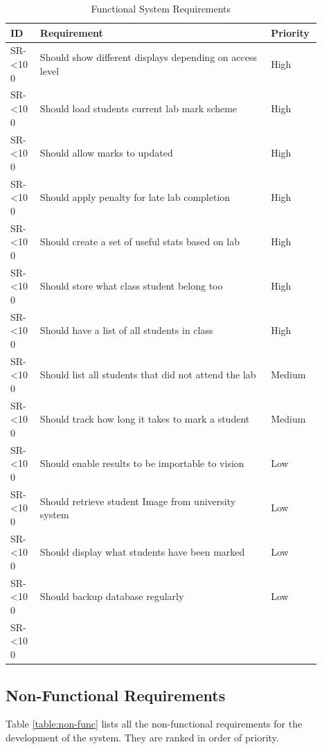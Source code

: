 \documentclass[12pt]{article}  %
\newcommand{\rid}[1]{\centering #1-\ifnum\value{requirement}<10 0\fi\arabic{requirement} \stepcounter{requirement}}
\begin{document}
\begin{spacing}{1.2}
\begin{longtable}{|p{0.09\linewidth}|p{0.7\linewidth}|p{0.1\linewidth}|}
\caption{Functional System Requirements} \label{table:funct-sys} \\
\hline


\textbf{ID} & \textbf{Requirement} & \textbf{Priority}\\
\hline \hline

\rid{SR} & Should show different displays depending on access level & High\\ \hline
\rid{SR} & Should load students current lab mark scheme & High\\ \hline
\rid{SR} & Should allow marks to updated & High\\ \hline
\rid{SR} & Should apply penalty for late lab completion & High\\ \hline
\rid{SR} & Should create a set of useful stats based on lab & High\\ \hline
\rid{SR} & Should store what class student belong too & High\\ \hline
\rid{SR} & Should have a list of all students in class & High\\ \hline
\rid{SR} & Should list all students that did not attend the lab & Medium\\ \hline
\rid{SR} & Should track how long it takes to mark a student & Medium \\ \hline
\rid{SR} & Should enable results to be importable to vision & Low\\ \hline
\rid{SR} & Should retrieve student Image from university system & Low\\ \hline
\rid{SR} & Should display what students have been marked & Low\\ \hline
\rid{SR} & Should backup database regularly & Low\\ \hline

\rid{SR} & & \\ \hline


\end{longtable}
\end{spacing}
\setcounter{requirement}{1}


\newpage
\subsection{Non-Functional Requirements}

Table \ref{table:non-func} lists all the non-functional requirements for the development of the system. They are ranked in order of priority.
\end{document}
